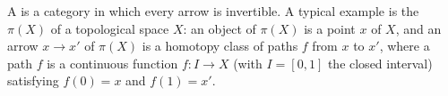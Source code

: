 A  is a category in which every arrow is invertible. A typical example is the  $\pi(X)$ of a topological space $X$: an object of $\pi(X)$ is a point $x$ of $X$, and an arrow $x \rightarrow x'$ of $\pi(X)$ is a homotopy class of paths $f$ from $x$ to $x'$, where a path $f$ is a continuous function $f: I \rightarrow X$ (with $I = [0, 1]$ the closed interval) satisfying $f(0) = x$ and $f(1) = x'$.
